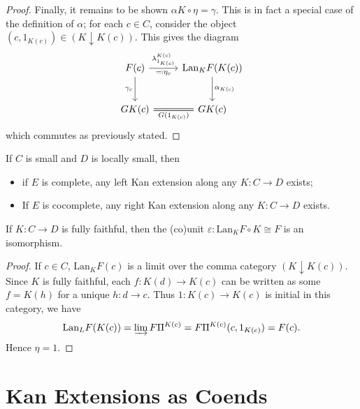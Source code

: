 \begin{proof}
	Finally, it remains to be shown $\alpha K \circ \eta=\gamma$. This is in fact a special case of the definition of $\alpha$; for each $c\in C$, consider the object $(c,1_{K(c)} )\in (K\downarrow K(c))$. This gives the diagram
	\[\begin{tikzcd}[row sep = 2.5em, column sep = 2.5em]
	F(c)\ar[" \lambda_{1_{K(c)} } ^{K(c)}  ", r] \ar[" \eqqcolon \eta_c "', draw=none, r] \ar[" \gamma_c "', d]  & \mathrm{Lan} _KF(K(c))\ar[" \alpha_{K(c)}  ", d]  \\
	GK(c)\ar[" G(1_{K(c)} ) "', equals, r]  & GK(c)
	\end{tikzcd}\]
	which commutes as previously stated.
\end{proof}
\begin{corollary}\label{cor:10.1}
	If $C$ is small and $D$ is locally small, then
	\begin{itemize}
		\item if $E$ is complete, any left Kan extension along any $K : C \to D$ exists;
		\item If $E$ is cocomplete, any right Kan extension along any $K : C \to D$ exists.
	\end{itemize}
\end{corollary}
\begin{corollary}\label{cor:10.2}
	If $K : C \to D$ is fully faithful, then the (co)unit $\varepsilon : \mathrm{Lan} _KF\circ K \cong F$ is an isomorphism.
\end{corollary}
\begin{proof}
	If $c\in C$, $\mathrm{Lan}_KF(c)$ is a limit over the comma category $(K\downarrow K(c))$. Since $K$ is fully faithful, each $f : K(d) \to K(c)$ can be written as some $f=K(h)$ for a unique $h : d \to c$. Thus $1: K(c) \to K(c)$ is initial in this category, we have
	\[
		\mathrm{Lan} _LF(K(c))=\varinjlim F\Pi^{K(c)} =F\Pi^{K(c)}(c,1_{K(c)} )=F(c)
	.\]
	Hence $\eta=1$.
\end{proof}

\section{Kan Extensions as Coends}

